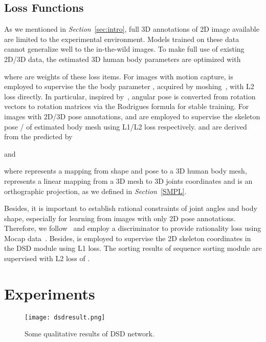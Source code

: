 \documentclass[10pt,twocolumn,letterpaper]{article}
\begin{document}
\subsection{Loss Functions}

As we mentioned in \textit{Section}~\ref{sec:intro}, full 3D annotations of 2D image available are limited to the experimental environment. Models trained on these data cannot generalize well to the in-the-wild images.  To make full use of existing 2D/3D data, the estimated 3D human body parameters are optimized with 

where  are weights of these loss items. For images with motion capture,  is employed to supervise the the body parameter , acquired by moshing~\cite{mosh}, with L2 loss directly. In particular, inspired by~\cite{hmr,humanshape}, angular pose  is converted from rotation vectors to  rotation matrices via the Rodrigues formula for stable training. For images with 2D/3D pose annotations,  and  are employed to supervise the skeleton pose / of estimated body mesh using L1/L2 loss respectively.  and  are derived from the predicted  by

and

where  represents a mapping from shape  and pose  to a 3D human body mesh,  represents a linear mapping from a 3D mesh to 3D joints coordinates and  is an orthographic projection, as we defined in \textit{Section}~\ref{SMPL}. 

Besides, it is important to establish rational constraints of joint angles and body shape, especially for learning from images with only 2D pose annotations. Therefore, we follow~\cite{hmr} and employ a discriminator to provide rationality loss  using Mocap data~\cite{mocap}. Besides,  is employed to supervise the 2D skeleton coordinates  in the DSD module using L1 loss. The sorting results of sequence sorting module are supervised with L2 loss of .

\section{Experiments}\label{sec:experiments}

\begin{figure}
	\begin{center}
		\texttt{[image: dsdresult.png]}
		\caption{Some qualitative results of DSD network.}
		\label{fig:dsdresult}
	\end{center}
\end{figure}
\end{document}
